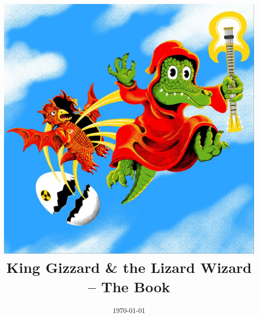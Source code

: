 \documentclass[a4paper,11pt,titlepage]{report}
\title{\centering\includegraphics[width=0.8\linewidth]{cover-image.jpg}\\[1cm]%
King Gizzard \& the Lizard Wizard -- The Book}
\date{\today}
\begin{document}
\newcommand{\album}[1]{\chapter{#1}}
\newcommand{\song}[1]{\section{#1}\index{#1}}
\newcommand{\note}[1]{\emph{#1}\newline}

\maketitle
\tableofcontents



\clearpage
\printindex 
\end{document}
